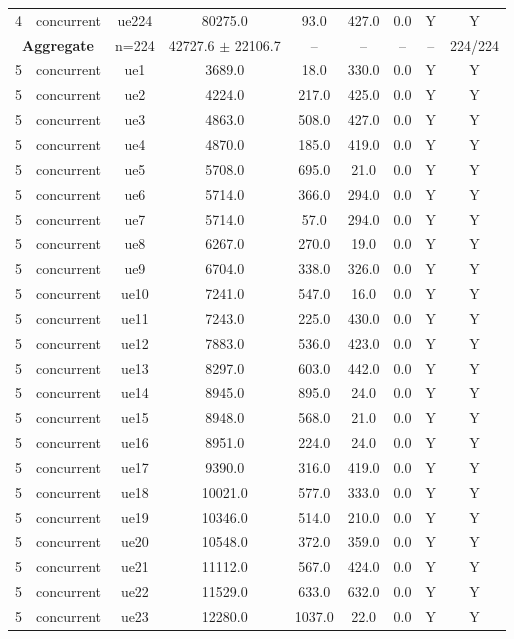 \begin{table}[ht]
\begin{tabular}{|c|c|c|c|c|c|c|c|c|}
4 & concurrent & ue224 & 80275.0 & 93.0 & 427.0 & 0.0 & Y & Y \\
\multicolumn{2}{|c|}{\textbf{Aggregate}} & n=224 & 42727.6 $\pm$ 22106.7 & -- & -- & -- & -- & 224/224 \\
\hline
5 & concurrent & ue1 & 3689.0 & 18.0 & 330.0 & 0.0 & Y & Y \\
5 & concurrent & ue2 & 4224.0 & 217.0 & 425.0 & 0.0 & Y & Y \\
5 & concurrent & ue3 & 4863.0 & 508.0 & 427.0 & 0.0 & Y & Y \\
5 & concurrent & ue4 & 4870.0 & 185.0 & 419.0 & 0.0 & Y & Y \\
5 & concurrent & ue5 & 5708.0 & 695.0 & 21.0 & 0.0 & Y & Y \\
5 & concurrent & ue6 & 5714.0 & 366.0 & 294.0 & 0.0 & Y & Y \\
5 & concurrent & ue7 & 5714.0 & 57.0 & 294.0 & 0.0 & Y & Y \\
5 & concurrent & ue8 & 6267.0 & 270.0 & 19.0 & 0.0 & Y & Y \\
5 & concurrent & ue9 & 6704.0 & 338.0 & 326.0 & 0.0 & Y & Y \\
5 & concurrent & ue10 & 7241.0 & 547.0 & 16.0 & 0.0 & Y & Y \\
5 & concurrent & ue11 & 7243.0 & 225.0 & 430.0 & 0.0 & Y & Y \\
5 & concurrent & ue12 & 7883.0 & 536.0 & 423.0 & 0.0 & Y & Y \\
5 & concurrent & ue13 & 8297.0 & 603.0 & 442.0 & 0.0 & Y & Y \\
5 & concurrent & ue14 & 8945.0 & 895.0 & 24.0 & 0.0 & Y & Y \\
5 & concurrent & ue15 & 8948.0 & 568.0 & 21.0 & 0.0 & Y & Y \\
5 & concurrent & ue16 & 8951.0 & 224.0 & 24.0 & 0.0 & Y & Y \\
5 & concurrent & ue17 & 9390.0 & 316.0 & 419.0 & 0.0 & Y & Y \\
5 & concurrent & ue18 & 10021.0 & 577.0 & 333.0 & 0.0 & Y & Y \\
5 & concurrent & ue19 & 10346.0 & 514.0 & 210.0 & 0.0 & Y & Y \\
5 & concurrent & ue20 & 10548.0 & 372.0 & 359.0 & 0.0 & Y & Y \\
5 & concurrent & ue21 & 11112.0 & 567.0 & 424.0 & 0.0 & Y & Y \\
5 & concurrent & ue22 & 11529.0 & 633.0 & 632.0 & 0.0 & Y & Y \\
5 & concurrent & ue23 & 12280.0 & 1037.0 & 22.0 & 0.0 & Y & Y \\

\end{tabular}
\end{table}
